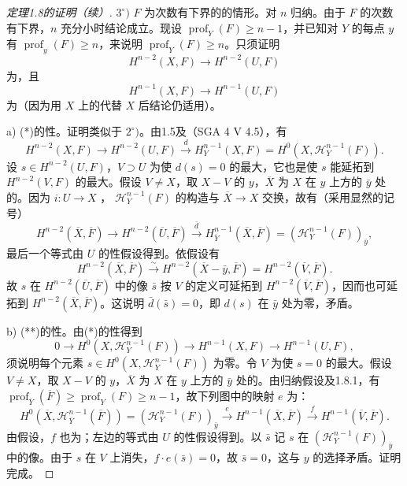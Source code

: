 \begin{proof}[定理1.8的证明（续）]
$3^\circ)$ $F$ 为次数有下界的的情形。对 $n$ 归纳。由于 $F$ 的次数有下界，$n$ 充分小时结论成立。现设 $\operatorname{prof}_Y(F)\geq n-1$，并已知对 $Y$ 的每点 $y$ 有 $\operatorname{prof}_y(F)\geq n$，来说明 $\operatorname{prof}_Y(F)\geq n$。只须证明
\[H^{n-2}(X,F)\longrightarrow H^{n-2}(U,F)\tag{*}\]
为，且
\[H^{n-1}(X,F)\longrightarrow H^{n-1}(U,F)\tag{**}\]
为（因为用 $X$ 上的代替 $X$ 后结论仍适用）。

a) (*)的性。证明类似于 $2^\circ)$。由1.5及（SGA 4 V 4.5），有
\[H^{n-2}(X,F)\longrightarrow H^{n-2}(U,F)\xrightarrow d H_Y^{n-1}(X,F)=H^0(X,\mathcal H_Y^{n-1}(F)).\]
设 $s\in H^{n-2}(U,F)$，$V\supset U$ 为使 $d(s)=0$ 的最大，它也是使 $s$ 能延拓到 $H^{n-2}(V,F)$ 的最大。假设 $V\ne X$，取 $X-V$ 的 $y$，$\overline X$ 为 $X$ 在 $y$ 上方的 $\bar y$ 处的。因为 $i:U\to X$ ，
$\mathcal H_Y^{n-1}(F)$ 的构造与 $\overline X\to X$ 交换，故有（采用显然的记号）
\[H^{n-2}(\overline X,\overline F)\longrightarrow H^{n-2}(\overline U,\overline F)\xrightarrow{\bar d}H_{\overline Y}^{n-1}(\overline X,\overline F)=(\mathcal H_Y^{n-1}(F))_{\bar y},\]
最后一个等式由 $U$ 的性假设得到。依假设有
\[H^{n-2}(\overline X,\overline F)\xrightarrow\sim H^{n-2}(\overline X-\bar y,\overline F)=H^{n-2}(\overline V,\overline F).\]
故 $s$ 在 $H^{n-2}(\overline U,\overline F)$ 中的像 $\bar s$ 按 $V$ 的定义可延拓到 $H^{n-2}(\overline V,\overline F)$，因而也可延拓到 $H^{n-2}(\overline X,\overline F)$。这说明 $\bar d(\bar s)=0$，即 $d(s)$ 在 $\bar y$ 处为零，矛盾。

b) (**)的性。由(*)的性得到
\[0\longrightarrow H^0(X,\mathcal H_Y^{n-1}(F))\longrightarrow H^{n-1}(X,F)\longrightarrow H^{n-1}(U,F),\]
须说明每个元素 $s\in H^0(X,\mathcal H_Y^{n-1}(F))$ 为零。令 $V$ 为使 $s=0$ 的最大。假设 $V\ne X$，取 $X-V$ 的 $y$，$\overline X$ 为 $X$ 在 $y$ 上方的 $\bar y$ 处的。由归纳假设及1.8.1，有 $\operatorname{prof}_{\overline Y}(\overline F)\geq\operatorname{prof}_Y(F)\geq n-1$，故下列图中的映射 $e$ 为：
\[H^0(\overline X,\mathcal H_{\overline Y}^{n-1}(\overline F))=(\mathcal H_Y^{n-1}(F))_{\bar y}\xrightarrow e H^{n-1}(\overline X,\overline F)\xrightarrow f H^{n-1}(\overline V,\overline F).\]
由假设，$f$ 也为；左边的等式由 $U$ 的性假设得到。以 $\bar s$ 记 $s$ 在 $(\mathcal H_Y^{n-1}(F))_{\bar y}$ 中的像。由于 $s$ 在 $V$ 上消失，$f\cdot e(\bar s)=0$，故 $\bar s=0$，这与 $y$ 的选择矛盾。证明完成。
\end{proof}
